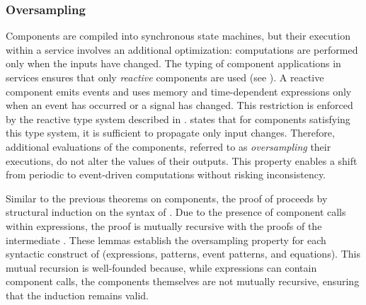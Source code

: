 \subsubsection{Oversampling}
\label{sec:semantics:grsync:theorems:oversampling}

Components are compiled into synchronous state machines, but their execution within a service
involves an additional optimization: computations are performed only when the inputs have changed.
The typing of component applications in services ensures that only \emph{reactive} components are
used (see ).
%
A reactive component emits events and uses memory and time-dependent expressions only when an event
has occurred or a signal has changed. This restriction is enforced by the reactive type system
described in .
 states
that for components satisfying this type system, it is sufficient to propagate only input changes.
Therefore, additional evaluations of the components, referred to as \emph{oversampling} their
executions, do not alter the values of their outputs. This property enables a shift from periodic
to event-driven computations without risking inconsistency.

Similar to the previous theorems on components, the proof of
 proceeds by structural induction on the syntax of
\GRSync. Due to the presence of component calls within expressions, the proof is mutually recursive
with the proofs of the intermediate . These lemmas establish the oversampling property for each syntactic construct of \GRSync
(expressions, patterns, event patterns, and equations). This mutual recursion is well-founded
because, while expressions can contain component calls, the components themselves are not mutually
recursive, ensuring that the induction remains valid.

